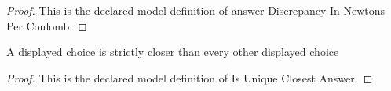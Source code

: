 \begin{proof}
  This is the declared model definition of answer Discrepancy In Newtons Per Coulomb.
\end{proof}
\begin{definition}
  \label{def:physics:phyx-mini-0831:phyxminiproblems-problemphyxmini0831-isuniqueclosestanswer}
  A displayed choice is strictly closer than every other displayed choice
\end{definition}
\begin{proof}
  This is the declared model definition of Is Unique Closest Answer.
\end{proof}
